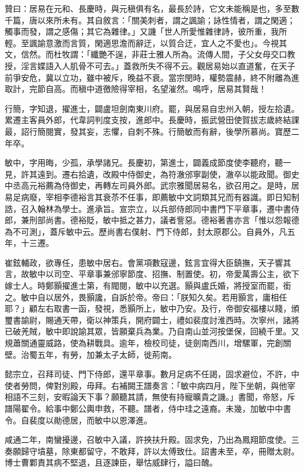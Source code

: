 \begin{pinyinscope}
 贊曰：居易在元和、長慶時，與元稹俱有名，最長於詩，它文未能稱是也，多至數千篇，唐以來所未有。其自敘言：「關美刺者，謂之諷諭；詠性情者，謂之閑適；觸事而發，謂之感傷；其它為雜律。」又譏「世人所愛惟雜律詩，彼所重，我所輕。至諷諭意激而言質，閑適思澹而辭迂，以質合迂，宜人之不愛也」。今視其文，信然。而杜牧謂：「纖艷不逞，非莊士雅人所為。流傳人間，子父女母交口教授，淫言媟語入人肌骨不可去。」蓋救所失不得不云。觀居易始以直道奮，在天子前爭安危，冀以立功，雖中被斥，晚益不衰。當宗閔時，權勢震赫，終不附離為進取計，完節自高。而稹中道徼險得宰相，名望漼然。鳴呼，居易其賢哉！



 行簡，字知退，擢進士，闢盧坦劍南東川府。罷，與居易自忠州入朝，授左拾遺。累遷主客員外郎，代韋詞判度支按，進郎中。長慶時，振武營田使賀拔志歲終結課最，詔行簡閱實，發其妄，志懼，自刺不殊。行簡敏而有辭，後學所慕尚。寶歷二年卒。



 敏中，字用晦，少孤，承學諸兄。長慶初，第進士，闢義成節度使李聽府，聽一見，許其遠到。遷右拾遺，改殿中侍御史，為符澈邠寧副使，澈卒以能政聞。御史中丞高元裕薦為侍御史，再轉左司員外郎。武宗雅聞居易名，欲召用之。是時，居易足病廢，宰相李德裕言其衰苶不任事，即薦敏中文詞類其兄而有器識。即日知制誥，召入翰林為學士。進承旨。宣宗立，以兵部侍郎同中書門下平章事，遷中書侍郎，兼刑部尚書。德裕貶，敏中抵之甚力，議者訾惡。德裕著書亦言「惟以怨報德為不可測」，蓋斥敏中云。歷尚書右僕射、門下侍郎，封太原郡公。自員外，凡五年，十三遷。



 崔鉉輔政，欲專任，患敏中居右。會黨項數寇邊，鉉言宜得大臣鎮撫，天子響其言，故敏中以司空、平章事兼邠寧節度、招撫、制置使。初，帝愛萬壽公主，欲下嫁士人。時鄭顥擢進士第，有閥閱，敏中以充選。顥與盧氏婚，將授室而罷，銜之。敏中自以居外，畏顥讒，自訴於帝。帝曰：「朕知久矣。若用顥言，庸相任耶？」顧左右取書一函，發視，悉顥所上，敏中乃安。及行，帝御安福樓以餞，頒璽書諭尉，賜通天帶，衛以神策兵，開府闢士，禮如裴度討淮西時。次寧州，諸將已破羌賊，敏中即說諭其眾，皆願棄兵為業。乃自南山並河按堡保，回繞千里。又規蕭關通靈威路，使為耕戰具。逾年，檢校司徒，徒劍南西川，增騾軍，完創關壁。治蜀五年，有勞，加兼太子太師，徙荊南。



 懿宗立，召拜司徒、門下侍郎，還平章事。數月足病不任謁，固求避位，不許，中使者勞問，俾對別殿，毋拜。右補闕王譜奏言：「敏中病四月，陛下坐朝，與他宰相語不三刻，安暇論天下事？願聽其請，無使有持寵曠貴之譏。」書聞，帝怒，斥譜陽翟令。給事中鄭公輿申救，不聽。譜者，侍中珪之遠裔。未幾，加敏中中書令。自裴度以勛德居，而敏中以恩澤進。



 咸通二年，南蠻擾邊，召敏中入議，許挾扶升殿。固求免，乃出為鳳翔節度使。三奏願歸守墳墓，除東都留守，不敢拜，許以太傅致仕。詔書未至，卒，冊贈太尉。博士曹鄴責其病不堅退，且逐諫臣，舉怙威肆行，謚曰醜。



\end{pinyinscope}